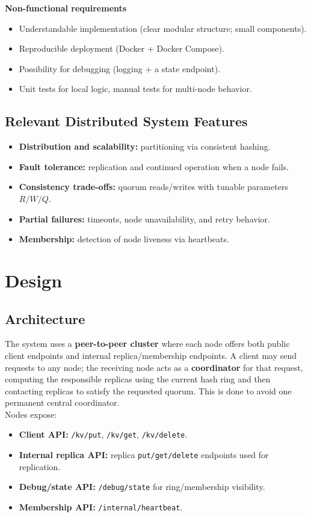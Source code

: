 \documentclass{scrartcl}
\begin{document}
\textbf{Non-functional requirements}
\begin{itemize}
  \item Understandable implementation (clear modular structure; small components).
  \item Reproducible deployment (Docker + Docker Compose).
  \item Possibility for debugging (logging + a state endpoint).
  \item Unit tests for local logic, manual tests for multi-node behavior.
\end{itemize}

\subsection{Relevant Distributed System Features}
\begin{itemize}
  \item \textbf{Distribution and scalability:} partitioning via consistent hashing.
  \item \textbf{Fault tolerance:} replication and continued operation when a node fails.
  \item \textbf{Consistency trade-offs:} quorum reads/writes with tunable parameters $R/W/Q$.
  \item \textbf{Partial failures:} timeouts, node unavailability, and retry behavior.
  \item \textbf{Membership:} detection of node liveness via heartbeats.
\end{itemize}

\section{Design}\label{design}

\subsection{Architecture}\label{architecture}
The system uses a \textbf{peer-to-peer cluster} where each node offers both public client endpoints and internal replica/membership endpoints. A client may send requests to any node; the receiving node acts as a \textbf{coordinator} for that request, computing the responsible replicas using the current hash ring and then contacting replicas to satisfy the requested quorum. This is done to avoid one permanent central coordinator.
\\
Nodes expose:
\begin{itemize}
  \item \textbf{Client API:} \texttt{/kv/put}, \texttt{/kv/get}, \texttt{/kv/delete}.
  \item \textbf{Internal replica API:} replica \texttt{put/get/delete} endpoints used for replication.
  \item \textbf{Debug/state API:} \texttt{/debug/state} for ring/membership visibility.
  \item \textbf{Membership API:} \texttt{/internal/heartbeat}.
\end{itemize}
\end{document}
